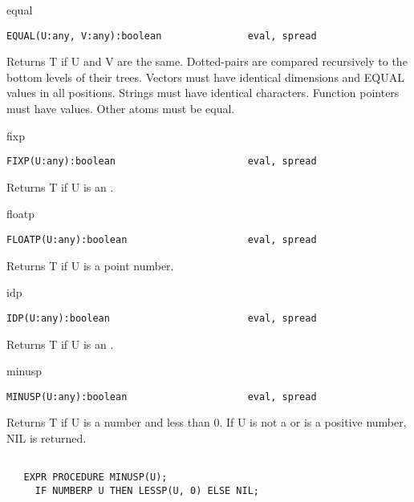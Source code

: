 \begin{Function}{equal}
\begin{verbatim}
EQUAL(U:any, V:any):boolean               eval, spread
\end{verbatim}
   Returns  T  if  U  and  V are  the  same.     Dotted-pairs are
   compared  recursively  to the  bottom  levels of  their trees.
   Vectors  must have  identical dimensions  and EQUAL  values in
   all  positions.     Strings  must  have  identical characters.
   Function  pointers must have   values.   Other atoms must be
    equal.

\end{Function}
\begin{Function}{fixp}
\begin{verbatim}
FIXP(U:any):boolean                       eval, spread
\end{verbatim}
   Returns T if U is an .
\end{Function}
\begin{Function}{floatp}
\begin{verbatim}
FLOATP(U:any):boolean                     eval, spread
\end{verbatim}
   Returns T if U is a  point number.
\end{Function}
\begin{Function}{idp}
\begin{verbatim}
IDP(U:any):boolean                        eval, spread
\end{verbatim}
   Returns T if U is an .
\end{Function}
\begin{Function}{minusp}
\begin{verbatim}
MINUSP(U:any):boolean                     eval, spread
\end{verbatim}
   Returns  T if U is  a number and less  than 0.  If  U is not a
    or is a positive number, NIL is returned.
\begin{verbatim}

   EXPR PROCEDURE MINUSP(U);
     IF NUMBERP U THEN LESSP(U, 0) ELSE NIL;
\end{verbatim}
\end{Function}
